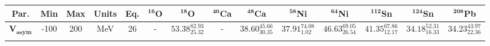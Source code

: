 \bgroup
\def\arraystretch{1.5}%
\begin{tabular}{ c c c c c c c c c c c c c c} 
\textbf{Par.} & \textbf{Min} & \textbf{Max} &                \textbf{Units} & \textbf{Eq.}& \textbf{$\mathbf{^{16}}$O}& \textbf{$\mathbf{^{18}}$O}& \textbf{$\mathbf{^{40}}$Ca}& \textbf{$\mathbf{^{48}}$Ca}& \textbf{$\mathbf{^{58}}$Ni}& \textbf{$\mathbf{^{64}}$Ni}& \textbf{$\mathbf{^{112}}$Sn}& \textbf{$\mathbf{^{124}}$Sn}& \textbf{$\mathbf{^{208}}$Pb}\\
 \hline 
$\mathbf{V_{asym}}$ & -100 & 200 & MeV & 26 & -  & $53.38^{82.93}_{25.32}$ & - & $38.60^{45.66}_{30.35}$ & $37.91^{74.08}_{1.02}$ & $46.63^{69.05}_{26.54}$ & $41.35^{67.86}_{12.17}$ & $34.18^{52.31}_{16.33}$ & $34.23^{43.97}_{22.36}$\\ 
\\ 
\end{tabular}
\egroup